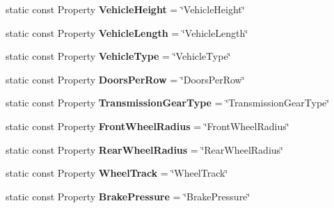 \begin{DoxyCompactItemize}
\item 
\hypertarget{classVehicleProperty_a0fde8e98bbffe557982301ecfbe595b1}{static const Property {\bfseries Vehicle\-Height} = \char`\"{}Vehicle\-Height\char`\"{}}\label{classVehicleProperty_a0fde8e98bbffe557982301ecfbe595b1}

\item 
\hypertarget{classVehicleProperty_a9f2d02d1ff69cf8547c6bf8b4ab20a93}{static const Property {\bfseries Vehicle\-Length} = \char`\"{}Vehicle\-Length\char`\"{}}\label{classVehicleProperty_a9f2d02d1ff69cf8547c6bf8b4ab20a93}

\item 
\hypertarget{classVehicleProperty_a5f6f4c19869a4d6307a38bbcb14f3325}{static const Property {\bfseries Vehicle\-Type} = \char`\"{}Vehicle\-Type\char`\"{}}\label{classVehicleProperty_a5f6f4c19869a4d6307a38bbcb14f3325}

\item 
\hypertarget{classVehicleProperty_a0818b919a2721ebc9242fe4fd62c1c06}{static const Property {\bfseries Doors\-Per\-Row} = \char`\"{}Doors\-Per\-Row\char`\"{}}\label{classVehicleProperty_a0818b919a2721ebc9242fe4fd62c1c06}

\item 
\hypertarget{classVehicleProperty_a1255b40637cabbcc28901a9ca5efce8c}{static const Property {\bfseries Transmission\-Gear\-Type} = \char`\"{}Transmission\-Gear\-Type\char`\"{}}\label{classVehicleProperty_a1255b40637cabbcc28901a9ca5efce8c}

\item 
\hypertarget{classVehicleProperty_a61603d2610548667c65b21e2e5dc146b}{static const Property {\bfseries Front\-Wheel\-Radius} = \char`\"{}Front\-Wheel\-Radius\char`\"{}}\label{classVehicleProperty_a61603d2610548667c65b21e2e5dc146b}

\item 
\hypertarget{classVehicleProperty_a7317a413f21ad1c44667ada3883be9e6}{static const Property {\bfseries Rear\-Wheel\-Radius} = \char`\"{}Rear\-Wheel\-Radius\char`\"{}}\label{classVehicleProperty_a7317a413f21ad1c44667ada3883be9e6}

\item 
\hypertarget{classVehicleProperty_a02d72875c252d2763a40b6b0eb5dbe75}{static const Property {\bfseries Wheel\-Track} = \char`\"{}Wheel\-Track\char`\"{}}\label{classVehicleProperty_a02d72875c252d2763a40b6b0eb5dbe75}

\item 
\hypertarget{classVehicleProperty_a4e7d3a126e0055cf51cac18598fdf845}{static const Property {\bfseries Brake\-Pressure} = \char`\"{}Brake\-Pressure\char`\"{}}\label{classVehicleProperty_a4e7d3a126e0055cf51cac18598fdf845}


\end{DoxyCompactItemize}
